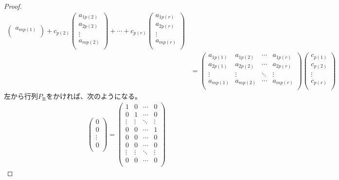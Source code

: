 \documentclass[dvipdfmx]{jsarticle}
\begin{document}
\begin{proof}
\begin{align*}
\begin{pmatrix}
a_{mp(1)} \\
\end{pmatrix} + c_{p(2)}\begin{pmatrix}
a_{1p(2)} \\
a_{2p(2)} \\
 \vdots \\
a_{mp(2)} \\
\end{pmatrix} + \cdots + c_{p(r)}\begin{pmatrix}
a_{1p(r)} \\
a_{2p(r)} \\
 \vdots \\
a_{mp(r)} \\
\end{pmatrix}\\
&= \begin{pmatrix}
a_{1p(1)} & a_{1p(2)} & \cdots & a_{1p(r)} \\
a_{2p(1)} & a_{2p(2)} & \cdots & a_{2p(r)} \\
 \vdots & \vdots & \ddots & \vdots \\
a_{mp(1)} & a_{mp(2)} & \cdots & a_{mp(r)} \\
\end{pmatrix}\begin{pmatrix}
c_{p(1)} \\
c_{p(2)} \\
 \vdots \\
c_{p(r)} \\
\end{pmatrix}
\end{align*}
左から行列$P_{\mathrm{R}}$をかければ、次のようになる。
\begin{align*}
\begin{pmatrix}
0 \\
0 \\
 \vdots \\
0 \\
\end{pmatrix} = \begin{pmatrix}
1 & 0 & \cdots & 0 \\
0 & 1 & \cdots & 0 \\
 \vdots & \vdots & \ddots & \vdots \\
0 & 0 & \cdots & 1 \\
0 & 0 & \cdots & 0 \\
0 & 0 & \cdots & 0 \\
 \vdots & \vdots & \ddots & \vdots \\
0 & 0 & \cdots & 0 \\

\end{pmatrix}
\end{align*}
\end{proof}
\end{document}
